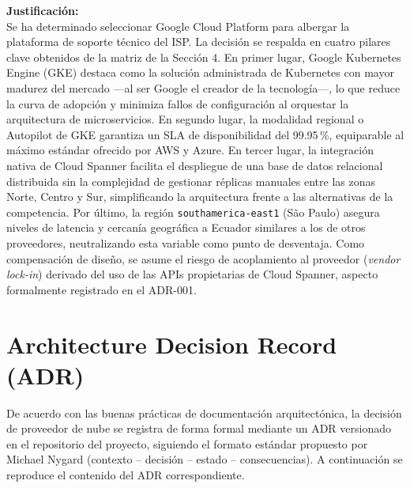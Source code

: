 \documentclass[12pt, a4paper]{article}
\begin{document}
\vspace{6pt}
\noindent\textbf{Justificación:}\\
Se ha determinado seleccionar Google Cloud Platform para albergar la plataforma de soporte técnico del ISP. La decisión se respalda en cuatro pilares clave obtenidos de la matriz de la Sección 4. En primer lugar, Google Kubernetes Engine (GKE) destaca como la solución administrada de Kubernetes con mayor madurez del mercado —al ser Google el creador de la tecnología—, lo que reduce la curva de adopción y minimiza fallos de configuración al orquestar la arquitectura de microservicios. En segundo lugar, la modalidad regional o Autopilot de GKE garantiza un SLA de disponibilidad del 99.95\,\%, equiparable al máximo estándar ofrecido por AWS y Azure. En tercer lugar, la integración nativa de Cloud Spanner facilita el despliegue de una base de datos relacional distribuida sin la complejidad de gestionar réplicas manuales entre las zonas Norte, Centro y Sur, simplificando la arquitectura frente a las alternativas de la competencia. Por último, la región \texttt{southamerica-east1} (São Paulo) asegura niveles de latencia y cercanía geográfica a Ecuador similares a los de otros proveedores, neutralizando esta variable como punto de desventaja. Como compensación de diseño, se asume el riesgo de acoplamiento al proveedor (\textit{vendor lock-in}) derivado del uso de las APIs propietarias de Cloud Spanner, aspecto formalmente registrado en el ADR-001.

\section{Architecture Decision Record (ADR)}

De acuerdo con las buenas prácticas de documentación arquitectónica, la decisión de proveedor de nube se registra de forma formal mediante un ADR versionado en el repositorio del proyecto, siguiendo el formato estándar propuesto por Michael Nygard (contexto -- decisión -- estado -- consecuencias). A continuación se reproduce el contenido del ADR correspondiente.
\end{document}
